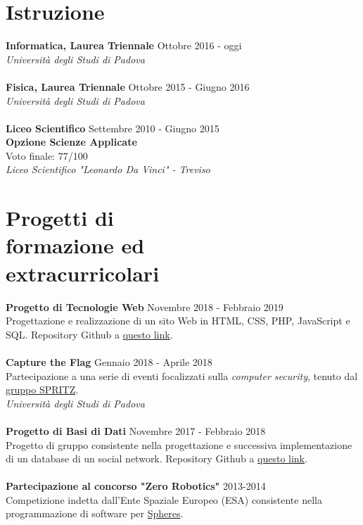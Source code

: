 \documentclass[margin, 10pt]{res}
\begin{document}
\begin{resume}
\section{Istruzione}
\textbf{Informatica, Laurea Triennale} \hfill Ottobre 2016 - oggi \\
\textit{Università degli Studi di Padova} \\ \\
\textbf{Fisica, Laurea Triennale} \hfill Ottobre 2015 - Giugno 2016 \\
\textit{Università degli Studi di Padova} \\ \\
\textbf{Liceo Scientifico} \hfill Settembre 2010 - Giugno 2015 \\
\textbf{Opzione Scienze Applicate} \\
Voto finale: 77/100 \\
\textit{Liceo Scientifico "Leonardo Da Vinci" - Treviso} 


\section{Progetti di \\ formazione ed \\ extracurricolari}
\textbf{Progetto di Tecnologie Web} \hfill Novembre 2018 - Febbraio 2019 \\
Progettazione e realizzazione di un sito Web in HTML, CSS, PHP, JavaScript e SQL. Repository Github a \href{https://github.com/enricobu96/TecWebUNIPD}{questo link}. \\ \\
\textbf{Capture the Flag} \hfill Gennaio 2018 - Aprile 2018 \\
Partecipazione a una serie di eventi focalizzati sulla \textit{computer security}, tenuto dal \href{https://spritz.math.unipd.it/}{gruppo SPRITZ}. \\
\textit{Università degli Studi di Padova} \\ \\
\textbf{Progetto di Basi di Dati} \hfill Novembre 2017 - Febbraio 2018 \\
Progetto di gruppo consistente nella progettazione e successiva implementazione di un database di un social network. Repository Github a \href{https://github.com/enricobu96/DB1718}{questo link}. \\ \\
\newpage
\textbf{Partecipazione al concorso "Zero Robotics"} \hfill 2013-2014 \\
Competizione indetta dall'Ente Spaziale Europeo (ESA) consistente nella programmazione di software per \href{https://www.esa.int/Science_Exploration/Human_and_Robotic_Exploration/Education/Robot_Spheres_in_zero-gravity_action}{Spheres}.


\end{resume}
\end{document}
